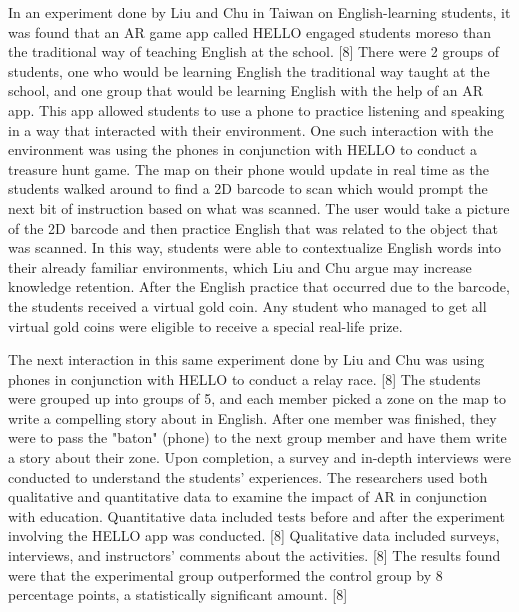 \documentclass{vgtc}                          %
\begin{document}
	In an experiment done by Liu and Chu in Taiwan on English-learning students, it was found that an AR game app called HELLO engaged students moreso than the traditional way of teaching English at the school. [8] There were 2 groups of students, one who would be learning English the traditional way taught at the school, and one group that would be learning English with the help of an AR app. This app allowed students to use a phone to practice listening and speaking in a way that interacted with their environment. One such interaction with the environment was using the phones in conjunction with HELLO to conduct a treasure hunt game. The map on their phone would update in real time as the students walked around to find a 2D barcode to scan which would prompt the next bit of instruction based on what was scanned. The user would take a picture of the 2D barcode and then practice English that was related to the object that was scanned. In this way, students were able to contextualize English words into their already familiar environments, which Liu and Chu argue may increase knowledge retention. After the English practice that occurred due to the barcode, the students received a virtual gold coin. Any student who managed to get all virtual gold coins were eligible to receive a special real-life prize. 
\vspace*{4mm}

	The next interaction in this same experiment done by Liu and Chu was using phones in conjunction with HELLO to conduct a relay race. [8] The students were grouped up into groups of 5, and each member picked a zone on the map to write a compelling story about in English. After one member was finished, they were to pass the "baton" (phone) to the next group member and have them write a story about their zone. Upon completion, a survey and in-depth interviews were conducted to understand the students' experiences. The researchers used both qualitative and quantitative data to examine the impact of AR in conjunction with education. Quantitative data included tests before and after the experiment involving the HELLO app was conducted. [8] Qualitative data included surveys, interviews, and instructors' comments about the activities. [8] The results found were that the experimental group outperformed the control group by 8 percentage points, a statistically significant amount. [8]
\vspace*{4mm}
\end{document}

